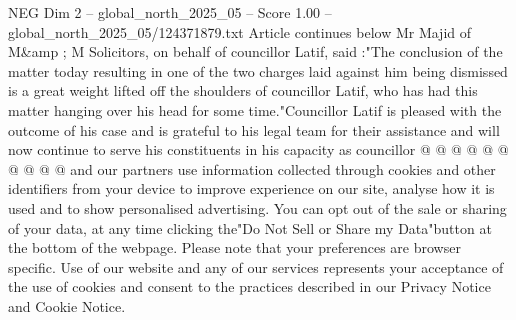 \begin{textsample}{NEG Dim 2 – global\_north\_2025\_05 – Score 1.00 – global\_north\_2025\_05/124371879.txt}
Article continues below Mr Majid of M\&amp ; M Solicitors, on behalf of councillor Latif, said :"The conclusion of the matter today resulting in one of the two charges laid against him being dismissed is a great weight lifted off the shoulders of councillor Latif, who has had this matter hanging over his head for some time."Councillor Latif is pleased with the outcome of his case and is grateful to his legal team for their assistance and will now continue to serve his constituents in his capacity as councillor @ @ @ @ @ @ @ @ @ @ and our partners use information collected through cookies and other identifiers from your device to improve experience on our site, analyse how it is used and to show personalised advertising.
You can opt out of the sale or sharing of your data, at any time clicking the"Do Not Sell or Share my Data"button at the bottom of the webpage.
Please note that your preferences are browser specific.
Use of our website and any of our services represents your acceptance of the use of cookies and consent to the practices described in our Privacy Notice and Cookie Notice.

\end{textsample}
